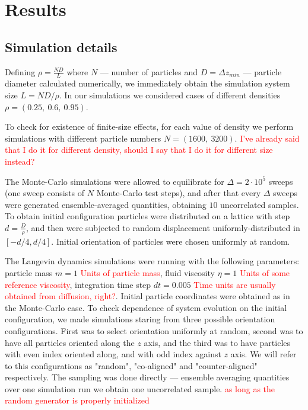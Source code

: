 \section{Results}
\subsection{Simulation details}
\label{subsec:simulation_details}

Defining $\rho = \frac{N D}{L}$ where $N$ --- number of particles and $D = \Delta z_{min}$ --- particle diameter calculated numerically, we immediately obtain the simulation system size $L = N D/ \rho$. In our simulations we considered cases of different densities $\rho = (0.25,\ 0.6,\ 0.95)$.

To check for existence of finite-size effects, for each value of density we perform simulations with different particle numbers $N = (1600,\ 3200)$. \textcolor{red}{I've already said that I do it for different density, should I say that I do it for different size instead?}

The Monte-Carlo simulations were allowed to equilibrate for $\Delta = 2 \cdot 10^5$ sweeps (one sweep consists of $N$ Monte-Carlo test steps), and after that every $\Delta$ sweeps were generated ensemble-averaged quantities, obtaining $10$ uncorrelated samples. To obtain initial configuration particles were distributed on a lattice with step $d = \frac{D}{\rho}$, and then were subjected to random displacement uniformly-distributed in $[-d/4, d/4]$. Initial orientation of particles were chosen uniformly at random.

The Langevin dynamics simulations were running with the following parameters: particle mass $m = 1$ \textcolor{red}{Units of particle mass}, fluid viscosity $\eta = 1$ \textcolor{red}{Units of some reference viscosity}, integration time step $d t = 0.005$ \textcolor{red}{Time units are usually obtained from diffusion, right?}. Initial particle coordinates were obtained as in the Monte-Carlo case. To check dependence of system evolution on the initial configuration, we made simulations staring from three possible orientation configurations. First was to select orientation uniformly at random, second was to have all particles oriented along the $z$ axis, and the third was to have particles with even index oriented along, and with odd index against $z$ axis. We will refer to this configurations as "random", "co-aligned" and "counter-aligned" respectively. The sampling was done directly --- ensemble averaging quantities over one simulation run we obtain one uncorrelated sample. \textcolor{red}{as long as the random generator is properly initialized}

